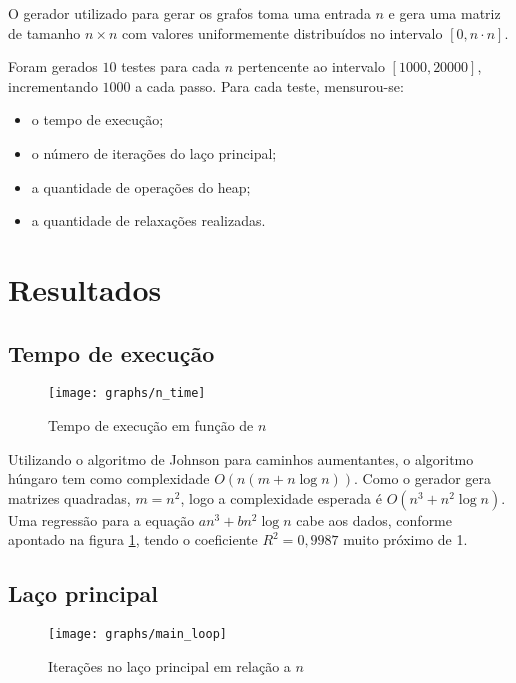 \documentclass[11pt]{article}
\begin{document}
O gerador utilizado para gerar os grafos toma uma entrada $n$ e gera uma matriz de tamanho $n \times n$ com valores uniformemente distribuídos no intervalo $[0, n \cdot n]$.

Foram gerados $10$ testes para cada $n$ pertencente ao intervalo $[1000, 20000]$, incrementando $1000$ a cada passo. Para cada teste, mensurou-se:

\begin{itemize}

\item o tempo de execução;
\item o número de iterações do laço principal;
\item a quantidade de operações do heap;
\item a quantidade de relaxações realizadas.

\end{itemize}

\section{Resultados}

\subsection{Tempo de execução}

\begin{figure}[H]
    \centering
    \caption{Tempo de execução em função de $n$}
    \label{fig:n_time}
    \texttt{[image: graphs/n\_time]}
\end{figure}

Utilizando o algoritmo de Johnson para caminhos aumentantes, o algoritmo húngaro tem como complexidade $O(n(m + n \log n))$.
Como o gerador gera matrizes quadradas, $m = n^2$, logo a complexidade esperada é $O(n^3 + n^2 \log n)$.
Uma regressão para a equação $an^3 + bn^2 \log n$ cabe aos dados, conforme apontado na figura \ref{fig:n_time}, tendo o coeficiente $R^2 = 0,9987$ muito próximo de 1.

\subsection{Laço principal}

\begin{figure}[H]
	\centering
	\caption{Iterações no laço principal em relação a $n$}
	\label{fig:main_loop}
	\texttt{[image: graphs/main\_loop]}
\end{figure}
\end{document}
